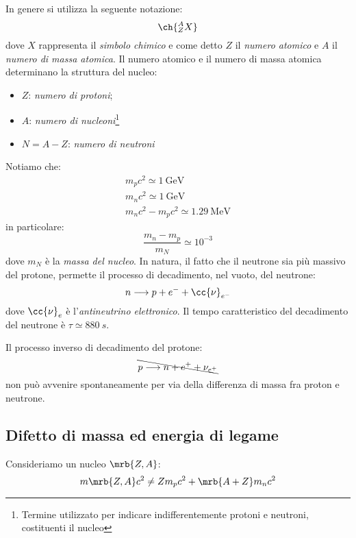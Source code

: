 In genere si utilizza la seguente notazione:
\begin{equation}
  \ch{_Z^AX}
\end{equation}
dove $X$ rappresenta il \textit{simbolo chimico} e come detto $Z$ il
\textit{numero atomico} e $A$ il \textit{numero di massa atomica}. Il numero
atomico e il numero di massa atomica determinano la struttura del nucleo:
\begin{itemize}
  \item $Z$: \textit{numero di protoni};
  \item $A$: \textit{numero di nucleoni}\footnote{
      Termine utilizzato per indicare indifferentemente protoni e neutroni,
      costituenti il nucleo
    }
  \item $N = A - Z$: \textit{numero di neutroni}
\end{itemize}
\begin{note}[]
  Notiamo che:
  \begin{align*}
    m_p c^2 \simeq \SI{1}{\GeV}
    \\
    m_n c^2 \simeq \SI{1}{\GeV}
    \\
    m_n c^2 - m_p c^2 \simeq \SI{1.29}{\MeV}
  \end{align*}
  in particolare:
  \begin{equation}
    \frac{m_n - m_p}{m_N} \simeq 10^{-3}
  \end{equation}
  dove $m_N$ è la \textit{massa del nucleo}.
  In natura, il fatto che il neutrone sia più massivo del protone, permette il
  processo di decadimento, nel vuoto, del neutrone:
  \begin{equation}
    n \longrightarrow p + e^- + \cc{\nu}_{e^-}
  \end{equation}
  dove $\cc{\nu}_{e}$ è l'\textit{antineutrino elettronico}. Il tempo
  caratteristico del decadimento del neutrone è $\tau \simeq \SI{880}{s}$.

  Il processo inverso di decadimento del protone:
  \begin{equation}
    \bcancel{p \longrightarrow n + e^+ + \nu_{e^+}}
  \end{equation}
  non può avvenire spontaneamente per via della differenza di massa fra proton
  e neutrone.
\end{note}

\subsection{Difetto di massa ed energia di legame}
Consideriamo un nucleo $\mrb{Z, A}$:
\begin{equation}
  m \mrb{Z, A} c^2 \neq Z m_p c^2 + \mrb{A + Z} m_n c^2
\end{equation}

